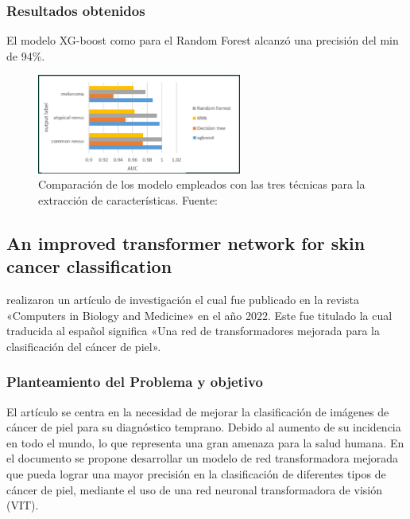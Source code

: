 \subsubsection{Resultados obtenidos}
El modelo XG-boost como para el Random Forest alcanzó una precisión del min de 94\%. 


\begin{figure}[h]
	\begin{center}
		\includegraphics[width=0.6\textwidth]{2/figuras/Skin_cancer_classification_imagen_01.png}
		\caption{Comparación de los modelo empleados con las  tres técnicas para la extracción de características. Fuente: \cite{ali_2022multiclass}}
		\label{1:fig}
	\end{center}
\end{figure}





\subsection{An improved transformer network for skin cancer classification \citep*{xin2022improved}}
\citeauthor{xin2022improved} realizaron un artículo de investigación el cual fue publicado en la revista «Computers in Biology and Medicine» en el año 2022. Este fue titulado  la cual traducida al español significa «Una red de transformadores mejorada para la clasificación del cáncer de piel».


\subsubsection{Planteamiento del Problema y objetivo}

El artículo se centra en la necesidad de mejorar la clasificación de imágenes de cáncer de piel para su diagnóstico temprano. Debido al aumento de su incidencia en todo el mundo, lo que representa una gran amenaza para la salud humana. 
En el documento se propone desarrollar un modelo de red transformadora mejorada que pueda lograr una mayor precisión en la clasificación de diferentes tipos de cáncer de piel, mediante el uso de una red neuronal transformadora de visión (VIT).





